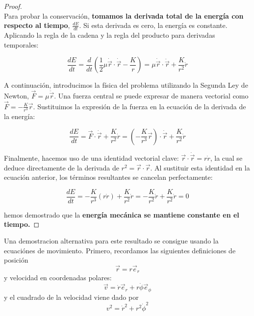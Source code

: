 \documentclass[openany]{book}
\theoremstyle{ucostyle}
\begin{document}
\begin{proof}
\\
Para probar la conservación, \textbf{tomamos la derivada total de la energía con respecto al tiempo}, $\frac{dE}{dt}$. Si esta derivada es cero, la energía es constante. Aplicando la regla de la cadena y la regla del producto para derivadas temporales:

\begin{equation*}
\frac{dE}{dt} = \frac{d}{dt} \left( \frac{1}{2} \mu \dot{\vec{r}} \cdot \dot{\vec{r}} - \frac{K}{r} \right) = \mu \dot{\vec{r}} \cdot \ddot{\vec{r}} + \frac{K}{r^2} \dot{r}
\end{equation*}

A continuación, introducimos la física del problema utilizando la Segunda Ley de Newton, $\vec{F} = \mu \ddot{\vec{r}}$. Una fuerza central se puede expresar de manera vectorial como $\vec{F} = -\frac{K}{r^3} \vec{r}$. Sustituimos la expresión de la fuerza en la ecuación de la derivada de la energía:

\begin{equation*}
\frac{dE}{dt} = \vec{F} \cdot \dot{\vec{r}} + \frac{K}{r^2} \dot{r} = \left( -\frac{K}{r^3} \vec{r} \right) \cdot \dot{\vec{r}} + \frac{K}{r^2} \dot{r}
\end{equation*}

Finalmente, hacemos uso de una identidad vectorial clave: $\vec{r} \cdot \dot{\vec{r}} = r \dot{r}$, la cual se deduce directamente de la derivada de $r^2 = \vec{r} \cdot \vec{r}$. Al sustituir esta identidad en la ecuación anterior, los términos resultantes se cancelan perfectamente:

\begin{equation*}
\frac{dE}{dt} = -\frac{K}{r^3} (r \dot{r}) + \frac{K}{r^2} \dot{r} = -\frac{K}{r^2} \dot{r} + \frac{K}{r^2} \dot{r} = 0
\end{equation*}

hemos demostrado que la \textbf{energía mecánica se mantiene constante en el tiempo.} 
\end{proof}

Una demostracion alternativa para este resultado se consigue usando la ecuaciónes de movimiento. Primero, recordamos las siguientes definiciones de posición 
\begin{equation*}
    \vec{r} = r\vec{e}_r
\end{equation*}
y velocidad en coordenadas polares:
\begin{equation*}
    \vec{v} = \dot{r}\vec{e}_r + r\dot{\phi}\vec{e}_\phi
\end{equation*}
 y el cuadrado de la velocidad viene dado por
 \begin{equation*}
     v^2 = \dot{r}^2 + r^2\dot{\phi}^2
 \end{equation*}
\end{document}
